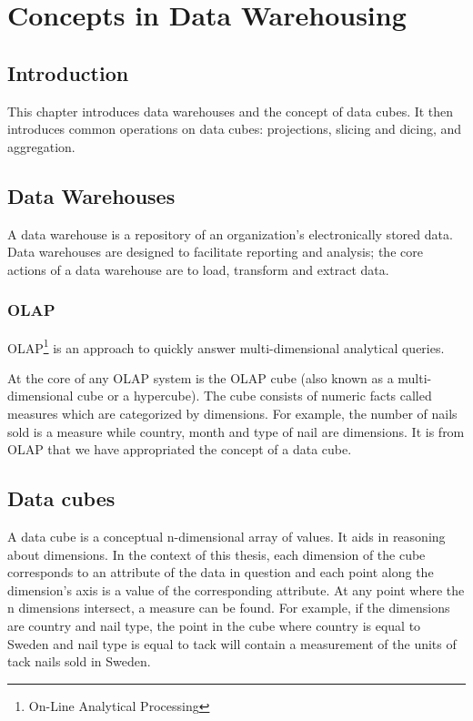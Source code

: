 \chapter{Concepts in Data Warehousing}

\section*{Introduction}

This chapter introduces data warehouses and the concept of data cubes. It then
introduces common operations on data cubes: projections, slicing and dicing,
and aggregation.


\section{Data Warehouses}

A data warehouse is a repository of an organization's electronically stored
data. Data warehouses are designed to facilitate reporting and analysis; the
core actions of a data warehouse are to load, transform and extract data.

\subsection*{OLAP}

OLAP\footnote{On-Line Analytical Processing} is an approach to quickly answer
multi-dimensional analytical queries.

At the core of any OLAP system is the OLAP cube (also known as a
multi-dimensional cube or a hypercube). The cube consists of numeric facts
called measures which are categorized by dimensions. For example, the number
of nails sold is a measure while country, month and type of nail are
dimensions. It is from OLAP that we have appropriated the concept of a data
cube.


\section{Data cubes}

A data cube is a conceptual n-dimensional array of values. It aids in
reasoning about dimensions. In the context of this thesis, each dimension of
the cube corresponds to an attribute of the data in question and each point
along the dimension's axis is a value of the corresponding attribute. At any
point where the n dimensions intersect, a measure can be found. For example,
if the dimensions are country and nail type, the point in the cube where
country is equal to Sweden and nail type is equal to tack will contain a
measurement of the units of tack nails sold in Sweden.

